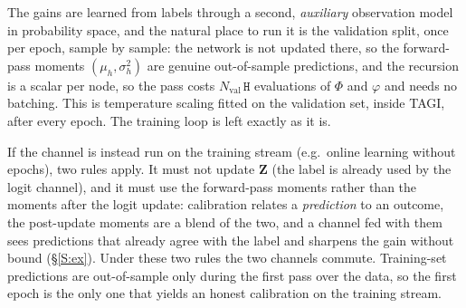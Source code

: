 \documentclass[letterpaper]{article}
\begin{document}
The gains are learned from labels through a second, \emph{auxiliary} observation model in probability space, and the natural place to run it is the validation split, once per epoch, sample by sample: the network is not updated there, so the forward-pass moments $(\mu_h,\sigma_h^2)$ are genuine out-of-sample predictions, and the recursion is a scalar per node, so the pass costs $N_{\text{val}}\,\mathtt H$ evaluations of $\Phi$ and $\varphi$ and needs no batching. This is temperature scaling fitted on the validation set, inside TAGI, after every epoch. The training loop is left exactly as it is.

If the channel is instead run on the training stream (e.g.\ online learning without epochs), two rules apply. It must not update $\bm Z$ (the label is already used by the logit channel), and it must use the forward-pass moments rather than the moments after the logit update: calibration relates a \emph{prediction} to an outcome, the post-update moments are a blend of the two, and a channel fed with them sees predictions that already agree with the label and sharpens the gain without bound (\S\ref{S:ex}). Under these two rules the two channels commute. Training-set predictions are out-of-sample only during the first pass over the data, so the first epoch is the only one that yields an honest calibration on the training stream.
\end{document}
